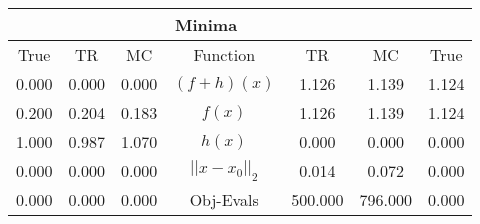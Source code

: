 \begin{tabular}{| c |c |c || c |c |c |c |}
    \hline
    \rowcolor[gray]{0.9}
\multicolumn{3}{|c|}{Parameters} & \multicolumn{4}{|c|}{Minima}\\ \hline True & TR & MC  & Function & TR & MC & True \\
    \hline
  \rowcolor[gray]{0.7}
  0.000 & 0.000 & 0.000   & $ (f + h)(x) $ & 1.126 & 1.139 & 1.124 \\
  \rowcolor[gray]{0.8}
  0.200 & 0.204 & 0.183   & $ f(x) $ & 1.126 & 1.139 & 1.124 \\
  \rowcolor[gray]{0.7}
  1.000 & 0.987 & 1.070   & $ h(x) $ & 0.000 & 0.000 & 0.000 \\
  \rowcolor[gray]{0.8}
  0.000 & 0.000 & 0.000   & $ ||x - x_0||_2 $ & 0.014 & 0.072 & 0.000 \\
  \rowcolor[gray]{0.7}
  0.000 & 0.000 & 0.000   & Obj-Evals & 500.000 & 796.000 & 0.000 \\
\end{tabular}

